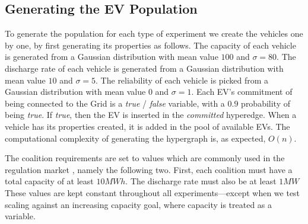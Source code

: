 \subsection{Generating the EV Population}\label{sec:generating}
To generate the population for each type of experiment we create the vehicles one by one, by first generating its properties as follows. The capacity of each vehicle is generated from a Gaussian distribution with mean value $100$ and $\sigma = 80$. The discharge rate of each vehicle is generated from a Gaussian distribution with mean value $10$ and $\sigma=5$. The reliability of each vehicle is picked from a Gaussian distribution with mean value $0$ and $\sigma=1$. Each EV's commitment of being connected to the Grid is a {\em true} / {\em false} variable, with a $0.9$ probability of being {\em true}. If {\em true}, then the EV is inserted in the {\em committed} hyperedge. When a vehicle has its properties created, it is added in the pool of available EVs. The computational complexity of generating the hypergraph is, as expected, $O(n)$.

The coalition requirements are set to values which are commonly used in the regulation market \cite{kamboj2011deploying}, namely the following two. First, each coalition must have a total capacity of at least $10MWh$. The discharge rate must also be at least $1MW$ \cite{kamboj2011deploying}
These values are kept constant throughout all experiments---except when we test scaling against an increasing capacity goal, where capacity is treated as a variable.


